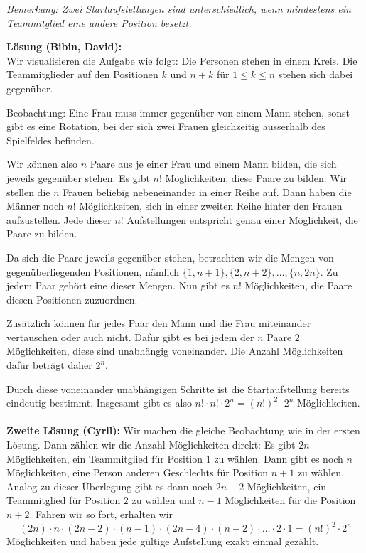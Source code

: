 \documentclass[language=german,style=solution]{smo}
\begin{document}
\begin{enumerate}
\emph{Bemerkung: Zwei Startaufstellungen sind unterschiedlich, wenn mindestens ein Teammitglied eine andere Position besetzt.}

\textbf{Lösung (Bibin, David):}\\
Wir visualisieren die Aufgabe wie folgt: Die Personen stehen in einem Kreis. Die Teammitglieder auf den Positionen $k$ und $n+k$ für $1 \leq k \leq n$ stehen sich dabei gegenüber.

Beobachtung: Eine Frau muss immer gegenüber von einem Mann stehen, sonst gibt es eine Rotation, bei der sich zwei Frauen gleichzeitig ausserhalb des Spielfeldes befinden.

Wir können also $n$ Paare aus je einer Frau und einem Mann bilden, die sich jeweils gegenüber stehen. Es gibt $n!$ Möglichkeiten, diese Paare zu bilden: Wir stellen die $n$ Frauen beliebig nebeneinander in einer Reihe auf. Dann haben die Männer noch $n!$ Möglichkeiten, sich in einer zweiten Reihe hinter den Frauen aufzustellen. Jede dieser $n!$ Aufstellungen entspricht genau einer Möglichkeit, die Paare zu bilden.

Da sich die Paare jeweils gegenüber stehen, betrachten wir die Mengen von gegenüberliegenden Positionen, nämlich $\{1,n+1\}, \{2,n+2\}, \dots , \{n,2n\}$. Zu jedem Paar gehört eine dieser Mengen. Nun gibt es $n!$ Möglichkeiten, die Paare diesen Positionen zuzuordnen.

Zusätzlich können für jedes Paar den Mann und die Frau miteinander vertauschen oder auch nicht. Dafür gibt es bei jedem der $n$ Paare $2$ Möglichkeiten, diese sind unabhängig voneinander. Die Anzahl Möglichkeiten dafür beträgt daher $2^n$.

Durch diese voneinander unabhängigen Schritte ist die Startaufstellung bereits eindeutig bestimmt.
Insgesamt gibt es also $n! \cdot n! \cdot 2^n = (n!)^2 \cdot 2^n$ Möglichkeiten.
\\
\\
\textbf{Zweite Lösung (Cyril):}
Wir machen die gleiche Beobachtung wie in der ersten Lösung. Dann zählen wir die Anzahl Möglichkeiten direkt:
Es gibt $2n$ Möglichkeiten, ein Teammitglied für Position $1$ zu wählen. Dann gibt es noch $n$ Möglichkeiten, eine Person anderen Geschlechts für Position $n+1$ zu wählen.
Analog zu dieser Überlegung gibt es dann noch $2n-2$ Möglichkeiten, ein Teammitglied für Position $2$ zu wählen und $n-1$ Möglichkeiten für die Position $n+2$. Fahren wir so fort, erhalten wir
\[
(2n)\cdot n \cdot (2n-2) \cdot (n-1) \cdot (2n-4) \cdot (n-2) \cdot \ldots \cdot 2 \cdot 1 = (n!)^2\cdot 2^n
\]
Möglichkeiten und haben jede gültige Aufstellung exakt einmal gezählt.


\end{enumerate}
\end{document}
